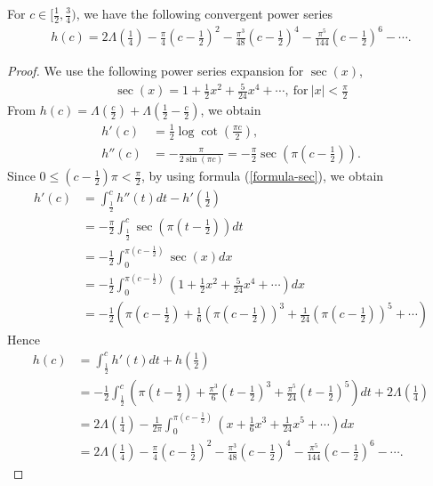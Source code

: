\documentclass[12pt]{amsart}
\begin{document}
\begin{lemma} \label{lemma-convergent}
For $c\in [\frac{1}{2},\frac{3}{4})$, we have the following convergent power series 
\begin{align}
    h(c)=2\Lambda\left(\frac{1}{4}\right)-\frac{\pi}{4}\left(c-\frac{1}{2}\right)^2-\frac{\pi^3}{48}\left(c-\frac{1}{2}\right)^4-\frac{\pi^5}{144}\left(c-\frac{1}{2}\right)^6-\cdots.
\end{align}
\end{lemma}
\begin{proof}
  We use the following power series expansion for $\sec(x)$,
\begin{align} \label{formula-sec}
    \sec(x)=1+\frac{1}{2}x^2+\frac{5}{24}x^4+\cdots, \ \text{for} \ |x|<\frac{\pi}{2}
    \end{align}
From  $h(c)=\Lambda(\frac{c}{2})+\Lambda(\frac{1}{2}-\frac{c}{2})$, we obtain 
\begin{align}
    h'(c)&=\frac{1}{2}\log \cot\left(\frac{\pi c}{2}\right), \\\nonumber
    h''(c)&=-\frac{\pi }{2\sin(\pi c)}=-\frac{\pi}{2}\sec\left(\pi\left(c-\frac{1}{2}\right)\right). 
\end{align}
    Since $0\leq \left(c-\frac{1}{2}\right)\pi<\frac{\pi}{2} $, by using formula (\ref{formula-sec}), we obtain 
    \begin{align}
        h'(c)&=\int_{\frac{1}{2}}^ch''(t)dt-h'\left(\frac{1}{2}\right)\\\nonumber
        &=-\frac{\pi}{2}\int_{\frac{1}{2}}^c \sec\left(\pi\left(t-\frac{1}{2}\right)\right)dt\\\nonumber
        &=-\frac{1}{2}\int_{0}^{\pi\left(c-\frac{1}{2}\right)}\sec(x) dx\\\nonumber
        &=-\frac{1}{2}\int_{0}^{\pi\left(c-\frac{1}{2}\right)}\left(1+\frac{1}{2}x^2+\frac{5}{24}x^4+\cdots\right)dx\\\nonumber
        &=-\frac{1}{2}\left(\pi\left(c-\frac{1}{2}\right)+\frac{1}{6}\left(\pi(c-\frac{1}{2})\right)^3+\frac{1}{24}\left(\pi(c-\frac{1}{2})\right)^5+\cdots\right)
    \end{align}
    Hence 
    \begin{align}
        h(c)&=\int_{\frac{1}{2}}^c h'(t)dt+h\left(\frac{1}{2}\right)\\\nonumber
        &=-\frac{1}{2}\int_{\frac{1}{2}}^c\left(\pi\left(t-\frac{1}{2}\right)+\frac{\pi^3}{6}\left(t-\frac{1}{2}\right)^3+\frac{\pi^5}{24}\left(t-\frac{1}{2}\right)^5\right)dt+2\Lambda\left(\frac{1}{4}\right)\\\nonumber
        &=2\Lambda\left(\frac{1}{4}\right)-\frac{1}{2\pi}\int_{0}^{\pi\left(c-\frac{1}{2}\right)}\left(x+\frac{1}{6}x^3+\frac{1}{24}x^5+\cdots\right)dx\\\nonumber
        &=2\Lambda\left(\frac{1}{4}\right)-\frac{\pi}{4}\left(c-\frac{1}{2}\right)^2-\frac{\pi^3}{48}\left(c-\frac{1}{2}\right)^4-\frac{\pi^5}{144}\left(c-\frac{1}{2}\right)^6-\cdots.
    \end{align}
\end{proof}
\end{document}
